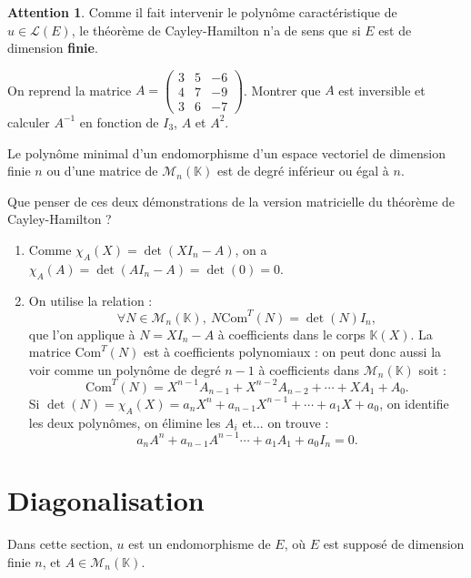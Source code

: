 \documentclass[french]{article}
\newcommand{\K}{\mathbb{K}}
\newcommand{\inv}{^{-1}}
\theoremstyle{plain}
\theoremstyle{definition}
\newtheorem*{attention}{Attention}
\theoremstyle{remark}
\begin{document}
	\begin{attention}
		Comme il fait intervenir le polynôme caractéristique de $u\in\mathcal{L}(E)$, le théorème de Cayley-Hamilton n'a de sens que si $E$ est de dimension \textbf{finie}.
	\end{attention}
	
	\begin{exo}
		On reprend la matrice $A=\begin{pmatrix}
			3&5&-6\\
			4&7&-9\\
			3&6&-7
		\end{pmatrix}$. Montrer que $A$ est inversible et calculer $A\inv$ en fonction de $I_3$, $A$ et $A^2$.
	\end{exo}
	
	\begin{cor}{}%
		Le polynôme minimal d'un endomorphisme d'un espace vectoriel de dimension finie $n$ ou d'une matrice de $\mathcal{M}_n(\K)$ est de degré inférieur ou égal à $n$.
	\end{cor}
	
	\begin{exo}
		Que penser de ces deux démonstrations de la version matricielle du théorème de Cayley-Hamilton ?
		\begin{enumerate}
			\item Comme $\chi_A(X)=\det(XI_n-A)$, on a $\chi_A(A)=\det(AI_n-A)=\det(0)=0$.
			\item On utilise la relation : $$\forall N\in\mathcal{M}_n(\K),\ N\text{Com}^T(N)=\det(N)I_n,$$ que l'on applique à $N=XI_n-A$ à coefficients dans le corps $\K(X)$. La matrice $\text{Com}^T(N)$ est à coefficients polynomiaux : on peut donc aussi la voir comme un polynôme de degré $n-1$ à coefficients dans $\mathcal{M}_n(\K)$ soit : $$\text{Com}^T(N)=X^{n-1}A_{n-1}+X^{n-2}A_{n-2}+\cdots+XA_1+A_0.$$ Si $\det(N)=\chi_A(X)=a_nX^n+a_{n-1}X^{n-1}+\cdots+a_1X+a_0$, on identifie les deux polynômes, on élimine les $A_i$ et... on trouve : $$a_nA^n+a_{n-1}A^{n-1}\cdots+a_1A_1+a_0I_n=0.$$
		\end{enumerate}
	\end{exo}
	
	\section{Diagonalisation}
	
	Dans cette section, $u$ est un endomorphisme de $E$, où $E$ est supposé de dimension finie $n$, et $A\in\mathcal{M}_n(\K)$.
	
\end{document}
